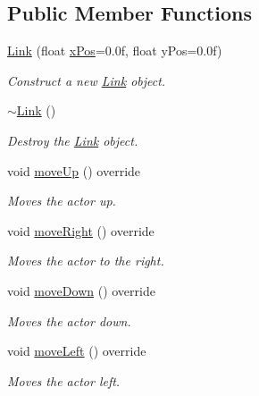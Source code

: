 \subsection*{Public Member Functions}
\begin{DoxyCompactItemize}
\item 
\mbox{\hyperlink{classRose_1_1Character_1_1Link_ac8ea34310b94a7be6738893244d4634e}{Link}} (float \mbox{\hyperlink{classRose_1_1Character_1_1Actor_a0668a9c0c457d1c45e709b48111ba79d}{x\+Pos}}=0.\+0f, float y\+Pos=0.\+0f)
\begin{DoxyCompactList}\small\item\em Construct a new \mbox{\hyperlink{classRose_1_1Character_1_1Link}{Link}} object. \end{DoxyCompactList}\item 
\mbox{\hyperlink{classRose_1_1Character_1_1Link_af29f7b4ab9b6a96223fa2364d98bb355}{$\sim$\+Link}} ()
\begin{DoxyCompactList}\small\item\em Destroy the \mbox{\hyperlink{classRose_1_1Character_1_1Link}{Link}} object. \end{DoxyCompactList}\item 
void \mbox{\hyperlink{classRose_1_1Character_1_1Link_a74ccaa0d2cf7af5b1980378d0cb14b22}{move\+Up}} () override
\begin{DoxyCompactList}\small\item\em Moves the actor up. \end{DoxyCompactList}\item 
void \mbox{\hyperlink{classRose_1_1Character_1_1Link_ad93043b13d83e8afb6f33c3c2572b05b}{move\+Right}} () override
\begin{DoxyCompactList}\small\item\em Moves the actor to the right. \end{DoxyCompactList}\item 
void \mbox{\hyperlink{classRose_1_1Character_1_1Link_a3e1834381624bf9012ea3921695d9007}{move\+Down}} () override
\begin{DoxyCompactList}\small\item\em Moves the actor down. \end{DoxyCompactList}\item 
void \mbox{\hyperlink{classRose_1_1Character_1_1Link_aab6113b81cfa995d11c6aa34894021cf}{move\+Left}} () override
\begin{DoxyCompactList}\small\item\em Moves the actor left. \end{DoxyCompactList}\item 

\end{DoxyCompactItemize}
